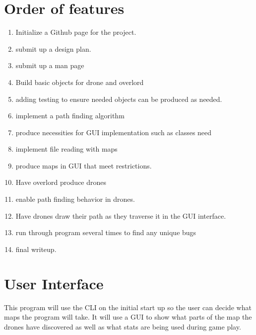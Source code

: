 \documentclass[12pt]{article}
\begin{document}
\section{Order of features}
\begin{enumerate}
  \item Initialize a Github page for the project.
  \item submit up a design plan.
  \item submit up a man page
  \item Build basic objects for drone and overlord
  \item adding testing to ensure needed objects can be produced as needed.
  \item implement a path finding algorithm
  \item produce necessities for GUI implementation such as classes need
  \item implement file reading with maps
  \item produce maps in GUI that meet restrictions.
  \item Have overlord produce drones
  \item enable path finding behavior in drones.
  \item Have drones draw their path as they traverse it in the GUI interface.
  \item run through program several times to find any unique bugs
  \item final writeup.
\end{enumerate}
\section{User Interface}
This program will use the CLI on the initial start up so the user can decide what maps the program will take. It will use a GUI to show what parts of the map the drones have discovered as well as what stats are being used during game play.
\end{document}
